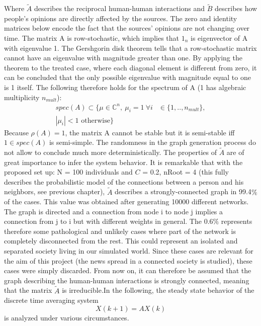 Where $\tilde{A}$ describes the reciprocal human-human interactions and $\tilde{B}$ describes how people's opinions are directly affected by the sources. The zero and identity matrices below encode the fact that the sources' opinions are not changing over time. \newline
The matrix A is row-stochastic, which implies that $1_n$ is eigenvector of A with eigenvalue 1. The Gershgorin disk theorem tells that a row-stochastic matrix cannot have an eigenvalue with magnitude greater than one. By applying the theorem to the treated case, where each diagonal element is different from zero, it can be concluded that the only possible eigenvalue with magnitude equal to one is 1 itself. The following therefore holds for the spectrum of A (1 has algebraic multiplicity $n_{mult}$):
\begin{align*}
spec(A) \subset \{\mu \in \mathbb{C}^n,\ \mu_i = 1\ \forall i & \in \{1,..,n_{mult}\},\\
| \mu_i | < 1 \text{ otherwise}\}
\end{align*}
Because $\rho(A) = 1$, the matrix A cannot be stable but it is semi-stable iff $1 \in spec(A)$ is semi-simple. \newline
The randomness in the graph generation process do not allow to conclude much more deterministically. The properties of $\tilde{A}$ are of great importance to infer the system behavior. It is remarkable that with the proposed set up: N = 100 individuals and $C$ = 0.2, nRoot = 4 (this fully describes the probabilistic model of the connections between a person and his neighbors, see previous chapter), $\tilde{A}$ describes a strongly-connected graph in 99.4$\%$ of the cases. This value was obtained after generating 10000 different networks. The graph is directed and a connection from node i to node j implies a connection from j to i but with different weights in general. The 0.6$\%$ represents therefore some pathological and unlikely cases where part of the network is completely disconnected from the rest. This could represent an isolated and separated society living in our simulated world. Since these cases are relevant for the aim of this project (the news spread in a connected society is studied), these cases were simply discarded. From now on, it can therefore be assumed that the graph describing the human-human interactions is strongly connected, meaning that the matrix $\tilde{A}$ is irreducible.\newline In the following, the steady state behavior of the discrete time averaging system 
$$
X(k+1) = AX(k)
$$
is analyzed under various circumstances.
